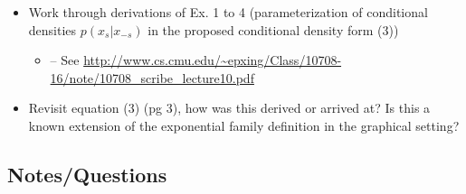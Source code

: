 \documentclass[11pt]{article}
\begin{document}
	\begin{itemize}
		\item Work through derivations of Ex. 1 to 4 (parameterization of conditional densities $p(x_s | x_{-s})$ in the proposed conditional density form (3))
        \begin{itemize}
            \item -- See \url{http://www.cs.cmu.edu/~epxing/Class/10708-16/note/10708_scribe_lecture10.pdf}
        \end{itemize}
        \item Revisit equation (3) (pg 3), how was this derived or arrived at? Is this a known extension of the exponential family definition in the graphical setting? 
	\end{itemize}

\subsection*{Notes/Questions}
	
\end{document}

